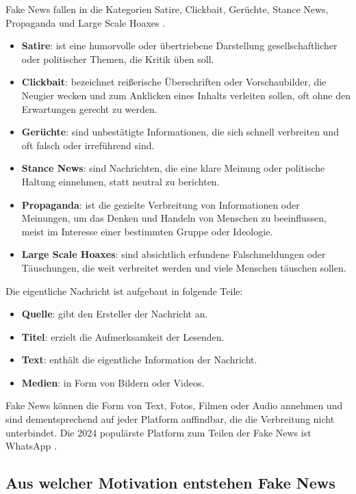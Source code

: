Fake News fallen in die Kategorien Satire, Clickbait, Gerüchte, Stance News, Propaganda und Large Scale Hoaxes \cite{Sharma:2024}.

\begin{itemize}
    \item \textbf{Satire}: ist eine humorvolle oder übertriebene Darstellung gesellschaftlicher oder politischer Themen, die Kritik üben soll.
    \item \textbf{Clickbait}: bezeichnet reißerische Überschriften oder Vorschaubilder, die Neugier wecken und zum Anklicken eines Inhalts verleiten sollen, oft ohne den Erwartungen gerecht zu werden.
    \item \textbf{Gerüchte}: sind unbestätigte Informationen, die sich schnell verbreiten und oft falsch oder irreführend sind.
    \item \textbf{Stance News}: sind Nachrichten, die eine klare Meinung oder politische Haltung einnehmen, statt neutral zu berichten.
    \item \textbf{Propaganda}: ist die gezielte Verbreitung von Informationen oder Meinungen, um das Denken und Handeln von Menschen zu beeinflussen, meist im Interesse einer bestimmten Gruppe oder Ideologie.
    \item \textbf{Large Scale Hoaxes}: sind absichtlich erfundene Falschmeldungen oder Täuschungen, die weit verbreitet werden und viele Menschen täuschen sollen.
\end{itemize}

Die eigentliche Nachricht ist aufgebaut in folgende Teile:

\begin{itemize}
    \item \textbf{Quelle}: gibt den Ersteller der Nachricht an.
    \item \textbf{Titel}: erzielt die Aufmerksamkeit der Lesenden.
    \item \textbf{Text}: enthält die eigentliche Information der Nachricht.
    \item \textbf{Medien}: in Form von Bildern oder Videos.
\end{itemize}

Fake News können die Form von Text, Fotos, Filmen oder Audio annehmen und sind dementsprechend auf jeder Platform auffindbar, 
die die Verbreitung nicht unterbindet. Die 2024 populärste Platform zum Teilen der Fake News ist WhatsApp \cite{Ashish2024}.

\subsection{Aus welcher Motivation entstehen Fake News}

